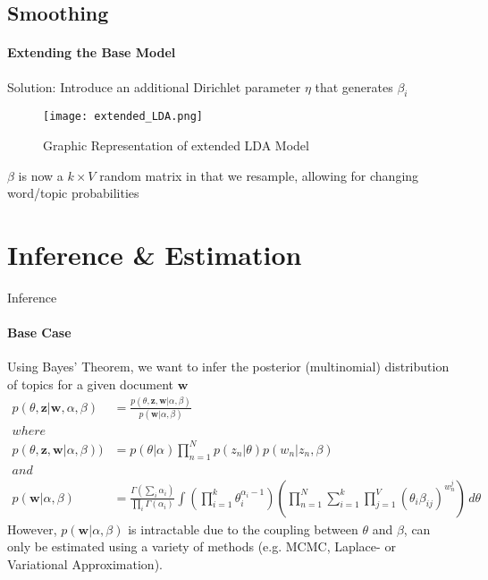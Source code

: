 \documentclass[aspectratio=169]{beamer}
\begin{document}
\subsection{Smoothing}
\begin{frame}{\insertsubsectionhead}
  \framesubtitle{Extending the Base Model}
  Solution: Introduce an additional Dirichlet parameter $\eta$ that generates $\beta_i$
  \begin{figure}
    \begin{center}
      \texttt{[image: extended\_LDA.png]}
    \end{center}
    \caption{Graphic Representation of extended LDA Model \cite{LDA}}
  \end{figure}
  $\beta$ is now a $k \times V$ random matrix in that we resample, allowing for changing word/topic probabilities
\end{frame}

\section{Inference \& Estimation}



\begin{frame}{Inference}
  \framesubtitle{Base Case}
  \fontsize{10pt}{7pt}\selectfont
  Using Bayes' Theorem, we want to infer the posterior (multinomial) distribution of topics for a given document $\textbf{w}$
    \begin{align*}  
        p(\theta, \textbf{z}|\textbf{w}, \alpha, \beta) &= \frac{p(\theta, \textbf{z}, \textbf{w}|\alpha, \beta)}{p(\textbf{w}|\alpha, \beta)}
        \\where\\
        p(\theta, \textbf{z}, \textbf{w}|\alpha, \beta)) &= p(\theta|\alpha)\prod^N_{n=1}p(z_n|\theta)p(w_n|z_n,\beta)
        \\and\\
        p(\textbf{w}|\alpha, \beta) &= \frac{\Gamma( \sum_i \alpha_i)}{\prod_i \Gamma(\alpha_i)} \int\left(\prod^k_{i=1} \theta_i^{\alpha_i-1}\right) \left(\prod^{N}_{n=1} \sum_{i = 1}^{k}\prod_{j=1}^V(\theta_i\beta_{ij})^{w^j_n}\right) \,d\theta    
    \end{align*} 
    However, $p(\textbf{w}|\alpha, \beta)$ is intractable due to the coupling between $\theta$ and $\beta$, can only be estimated using a variety of methods (e.g. MCMC, Laplace- or Variational Approximation).
\end{frame}
\end{document}
